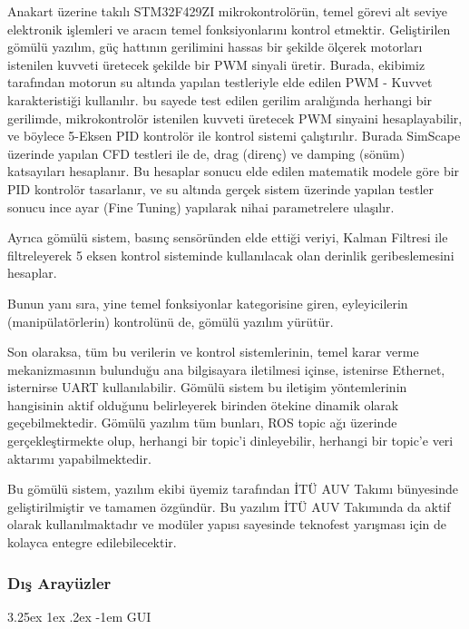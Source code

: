 \documentclass[12pt]{article}
\makeatletter
\newcounter{subsubsubsection}[subsubsection]
\renewcommand\paragraph{\@startsection{paragraph}{5}{\z@}%
  {3.25ex \@plus1ex \@minus.2ex}%
  {-1em}%
  {\normalfont\normalsize\bfseries}}
\makeatother
\begin{document}
Anakart üzerine takılı STM32F429ZI mikrokontrolörün, temel görevi alt seviye elektronik işlemleri ve aracın temel fonksiyonlarını kontrol etmektir. Geliştirilen gömülü yazılım, güç hattının gerilimini hassas bir şekilde ölçerek motorları istenilen kuvveti üretecek şekilde bir PWM sinyali üretir. Burada, ekibimiz tarafından motorun su altında yapılan testleriyle elde edilen PWM - Kuvvet karakteristiği kullanılır. bu sayede test edilen gerilim aralığında herhangi bir gerilimde, mikrokontrolör istenilen kuvveti üretecek PWM sinyaini hesaplayabilir, ve böylece 5-Eksen PID kontrolör ile kontrol sistemi çalıştırılır. Burada SimScape üzerinde yapılan CFD testleri ile de, drag (direnç) ve damping (sönüm) katsayıları hesaplanır. Bu hesaplar sonucu elde edilen matematik modele göre bir PID kontrolör tasarlanır, ve su altında gerçek sistem üzerinde yapılan testler sonucu ince ayar (Fine Tuning) yapılarak nihai parametrelere ulaşılır. 

Ayrıca gömülü sistem, basınç sensöründen elde ettiği veriyi, Kalman Filtresi ile filtreleyerek 5 eksen kontrol sisteminde kullanılacak olan derinlik geribeslemesini hesaplar.

Bunun yanı sıra, yine temel fonksiyonlar kategorisine giren, eyleyicilerin (manipülatörlerin) kontrolünü de, gömülü yazılım yürütür.

Son olaraksa, tüm bu verilerin ve kontrol sistemlerinin, temel karar verme mekanizmasının bulunduğu ana bilgisayara iletilmesi içinse, istenirse Ethernet, isternirse UART kullanılabilir. Gömülü sistem bu iletişim yöntemlerinin hangisinin aktif olduğunu belirleyerek birinden ötekine dinamik olarak geçebilmektedir. Gömülü yazılım tüm bunları, ROS topic ağı üzerinde gerçekleştirmekte olup, herhangi bir topic'i dinleyebilir, herhangi bir topic'e veri aktarımı yapabilmektedir. 

Bu gömülü sistem, yazılım ekibi üyemiz tarafından İTÜ AUV Takımı bünyesinde geliştirilmiştir ve tamamen özgündür. Bu yazılım İTÜ AUV Takımında da aktif olarak kullanılmaktadır ve modüler yapısı sayesinde teknofest yarışması için de kolayca entegre edilebilecektir.  





\subsubsection{Dış Arayüzler}


\paragraph{} GUI
\end{document}
